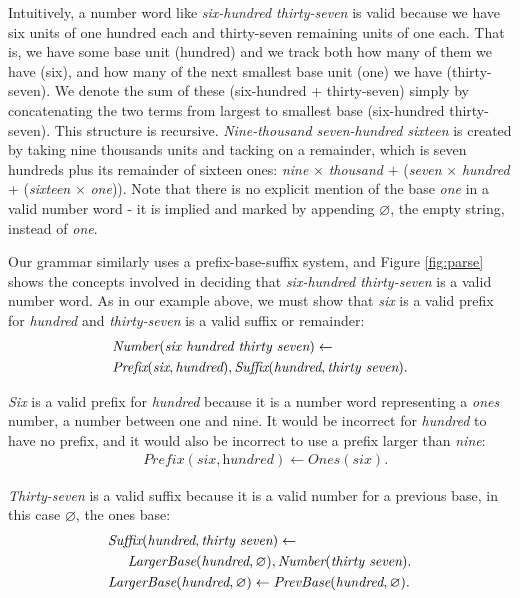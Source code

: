 \documentclass[10pt,letterpaper]{article}
\begin{document}
Intuitively, a number word like \emph{six-hundred thirty-seven} is
valid because we have six units of one hundred each and thirty-seven
remaining units of one each. That is, we have some base unit (hundred)
and we track both how many of them we have (six), and how many of the
next smallest base unit (one) we have (thirty-seven). We denote the
sum of these (six-hundred + thirty-seven) simply by concatenating the
two terms from largest to smallest base (six-hundred thirty-seven).
This structure is recursive. \emph{Nine-thousand seven-hundred
  sixteen} is created by taking nine thousands units and tacking on a
remainder, which is seven hundreds plus its remainder of sixteen ones:
\emph{nine} $\times$ \emph{thousand} $+$ (\emph{seven} $\times$
\emph{hundred} + (\emph{sixteen} $\times$ \emph{one})). Note that
there is no explicit mention of the base \emph{one} in a valid number
word - it is implied and marked by appending $\varnothing$, the empty
string, instead of \emph{one}.

Our grammar similarly uses a prefix-base-suffix system, and Figure
\ref{fig:parse} shows the concepts involved in deciding that
\emph{six-hundred thirty-seven} is a valid number word. As in our
example above, we must show that \emph{six} is a valid prefix for
\emph{hundred} and \emph{thirty-seven} is a valid suffix or remainder:
\setlength{\jot}{0pt}
\begin{align}
  & \textit{Number}(\textit{six hundred thirty seven}) \leftarrow\\
  & \textit{Prefix}(\textit{six}, \textit{hundred}), \textit{Suffix}(\textit{hundred}, \textit{thirty seven}).\notag
\end{align}

\noindent\emph{Six} is a valid prefix for \emph{hundred} because it is
a number word representing a \emph{ones} number, a number between one
and nine. It would be incorrect for \emph{hundred} to have no prefix,
and it would also be incorrect to use a prefix larger than
\emph{nine}:
\begin{align}
  & \textit{Prefix}(\textit{six}, \textit{hundred}) \leftarrow \textit{Ones}(\textit{six}).
\end{align}

\noindent\emph{Thirty-seven} is a valid suffix because it is a valid
number for a previous base, in this case $\varnothing$, the ones base:
\begin{align}
  & \textit{Suffix}(\textit{hundred}, \textit{thirty seven}) \leftarrow\\
  & \hspace{0.5cm}  \textit{LargerBase}(\textit{hundred}, \varnothing), \textit{Number}(\textit{thirty seven}). \notag\\
 &  \textit{LargerBase}(\textit{hundred}, \varnothing) \leftarrow \textit{PrevBase}(\textit{hundred}, \varnothing).
\end{align}
\end{document}
